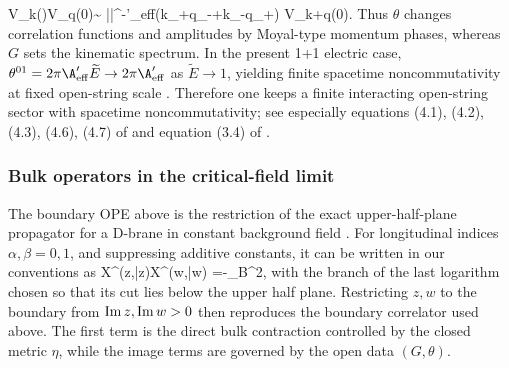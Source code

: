 \documentclass[12pt]{article}
\newcommand{\wt}[1]{\widetilde{#1}}
\begin{document}
\ie
V_k(\tau)V_q(0)\sim
|\tau|^{-\A'_{\rm eff}(k_+q_-+k_-q_+)}
\exp\!
V_{k+q}(0).
\fe
Thus $\theta$ changes correlation functions and amplitudes by Moyal-type momentum phases, whereas $G$ sets the kinematic spectrum. In the present 1+1 electric case, $\theta^{01}=2\pi\A'_{\rm eff}\widetilde E\to 2\pi\A'_{\rm eff}$ as $\widetilde E\to 1$, yielding finite spacetime noncommutativity at fixed open-string scale \cite{seiberg1999stringtheorynoncommutativegeometry,seiberg2000stringsbackgroundelectricfield,gopakumar2000sdualitynoncommutativegaugetheory}. Therefore one keeps a finite interacting open-string sector with spacetime noncommutativity; see especially equations (4.1), (4.2), (4.3), (4.6), (4.7) of \cite{seiberg2000stringsbackgroundelectricfield} and equation (3.4) of \cite{gopakumar2000sdualitynoncommutativegaugetheory}.
\subsubsection{Bulk operators in the critical-field limit}
\noindent
The boundary OPE above is the restriction of the exact upper-half-plane propagator for a D-brane in constant background field \cite{seiberg1999stringtheorynoncommutativegeometry}. For longitudinal indices $\alpha,\beta=0,1$, and suppressing additive constants, it can be written in our conventions as
\ie\label{ncosbulkuhp}
\langle X^\alpha(z,\bar z)X^\beta(w,\bar w)\rangle
=-\wt\ell_B^2\left[
\eta^{\alpha\beta}\ln|z-w|
-\eta^{\alpha\beta}\ln|z-\bar w|
+G^{\alpha\beta}\ln|z-\bar w|^2
+{1\over 2\pi\wt\ell_B^2}\theta^{\alpha\beta}
\ln\!\frac{z-\bar w}{\bar z-w}
\right],
\fe
with the branch of the last logarithm chosen so that its cut lies below the upper half plane. Restricting $z,w$ to the boundary from ${\rm Im}\,z,{\rm Im}\,w>0$ then reproduces the boundary correlator used above. The first term is the direct bulk contraction controlled by the closed metric $\eta$, while the image terms are governed by the open data $(G,\theta)$.
\end{document}
